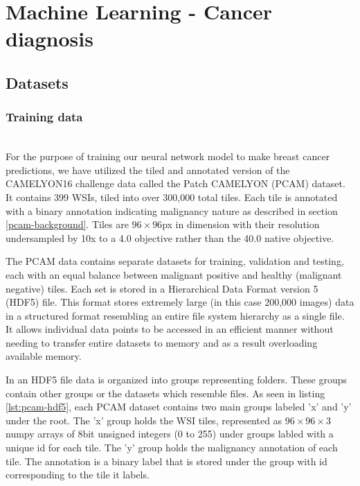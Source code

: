 \documentclass{l4proj}
\begin{document}
\section{Machine Learning - Cancer diagnosis}
\subsection{Datasets}
\subsubsection{Training data}\hfill\\
For the purpose of training our neural network model to make breast cancer predictions, we have utilized the tiled and annotated version of the CAMELYON16 challenge data called the Patch CAMELYON (PCAM) dataset. It contains 399 WSIs, tiled into over 300,000 total tiles. Each tile is annotated with a binary annotation indicating malignancy nature as described in section \ref{pcam-background}. Tiles are \(96 \times 96\)px in dimension with their resolution undersampled by 10x to a 4.0 objective rather than the 40.0 native objective. 

The PCAM data contains separate datasets for training, validation and testing, each with an equal balance between malignant positive and healthy (malignant negative) tiles. Each set is stored in a Hierarchical Data Format version 5 (HDF5) file. This format stores extremely large (in this case 200,000 images) data in a structured format resembling an entire file system hierarchy as a single file. It allows individual data points to be accessed in an efficient manner without needing to transfer entire datasets to memory and as a result overloading available memory. 

In an HDF5 file data is organized into groups representing folders. These groups contain other groups or the datasets which resemble files. As seen in listing \ref{lst:pcam-hdf5}, each PCAM dataset contains two main groups labeled 'x' and 'y' under the root. The 'x' group holds the WSI tiles, represented as \(96 \times 96 \times 3\) numpy arrays of 8bit unsigned integers (0 to 255) under groups labled with a unique id for each tile. The 'y' group holds the malignancy annotation of each tile. The annotation is a binary label that is stored under the group with id corresponding to the tile it labels. 
\end{document}
